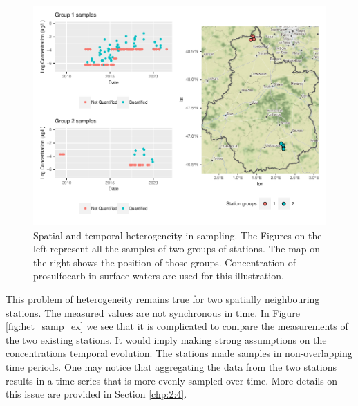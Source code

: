 \begin{figure}[htbp]
    \centering
    \includegraphics{figs/Chap3/Het_sampling.pdf}
    \caption{Spatial and temporal heterogeneity in sampling. The Figures on the left represent all the samples of two groups of stations. The map on the right shows the position of those groups. Concentration of prosulfocarb in surface waters are used for this illustration.}
    \label{fig:het_sampspat}
\end{figure}

This problem of heterogeneity remains true for two spatially neighbouring stations. The measured values are not synchronous in time. In Figure \ref{fig:het_samp_ex} we see that it is complicated to compare the measurements of the two existing stations. It would imply making strong assumptions on the concentrations temporal evolution. The stations made samples in non-overlapping time periods. One may notice that aggregating the data from the two stations results in a time series that is more evenly sampled over time. More details on this issue are provided in Section \ref{chp:2:4}. 

